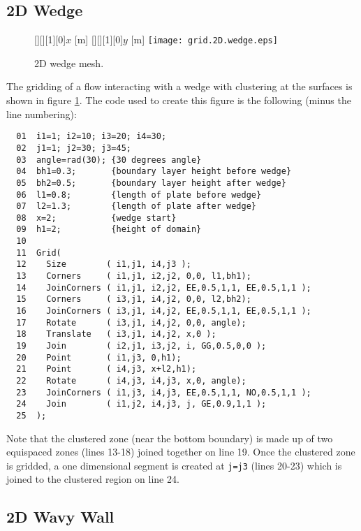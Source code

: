 \documentclass{warpdoc}
\newcommand{\fontxfig}{\footnotesize\scalefont{0.918}}
\begin{document}
\subsection{2D Wedge}

%
\begin{figure}[h]
\vspace{0.3cm}
   \fontxfig
   [][][1][0]{$x$ [m]}
   [][][1][0]{$y$ [m]}
   \texttt{[image: grid.2D.wedge.eps]}
\caption{2D wedge mesh.}
\label{fig:gridwedge}
\end{figure}
%
The gridding of a flow interacting with a wedge with clustering at the surfaces is shown in figure \ref{fig:gridwedge}. The code used
to create this figure is the following (minus the line numbering):
%
\begin{verbatim}
  01  i1=1; i2=10; i3=20; i4=30;
  02  j1=1; j2=30; j3=45;
  03  angle=rad(30); {30 degrees angle}
  04  bh1=0.3;       {boundary layer height before wedge}
  05  bh2=0.5;       {boundary layer height after wedge}
  06  l1=0.8;        {length of plate before wedge}
  07  l2=1.3;        {length of plate after wedge}
  08  x=2;           {wedge start}
  09  h1=2;          {height of domain}
  10
  11  Grid(
  12    Size        ( i1,j1, i4,j3 );
  13    Corners     ( i1,j1, i2,j2, 0,0, l1,bh1);
  14    JoinCorners ( i1,j1, i2,j2, EE,0.5,1,1, EE,0.5,1,1 );
  15    Corners     ( i3,j1, i4,j2, 0,0, l2,bh2);
  16    JoinCorners ( i3,j1, i4,j2, EE,0.5,1,1, EE,0.5,1,1 );
  17    Rotate      ( i3,j1, i4,j2, 0,0, angle);
  18    Translate   ( i3,j1, i4,j2, x,0 );
  19    Join        ( i2,j1, i3,j2, i, GG,0.5,0,0 );
  20    Point       ( i1,j3, 0,h1);
  21    Point       ( i4,j3, x+l2,h1);
  22    Rotate      ( i4,j3, i4,j3, x,0, angle);
  23    JoinCorners ( i1,j3, i4,j3, EE,0.5,1,1, NO,0.5,1,1 );
  24    Join        ( i1,j2, i4,j3, j, GE,0.9,1,1 );
  25  );
\end{verbatim}
%
Note that
the clustered zone (near the bottom boundary) is made up of
two equispaced zones (lines 13-18) joined together on line 19.
Once the clustered zone is gridded, a one dimensional segment
is created at \verb|j=j3| (lines 20-23) which is joined to the
clustered region on line 24.


\subsection{2D Wavy Wall}
\end{document}
